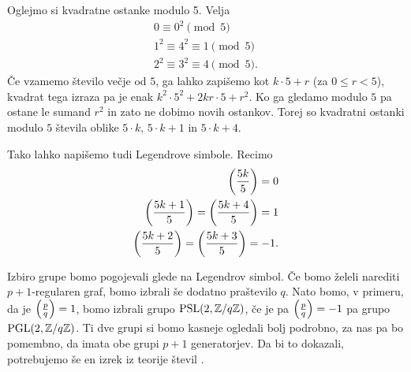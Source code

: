\begin{primer}
    Oglejmo si kvadratne ostanke modulo 5.
    Velja
    \begin{align*}
        0 \equiv 0^2 \pmod 5            \\
        1^2 \equiv 4^2 \equiv 1 \pmod 5 \\
        2^2 \equiv 3^2 \equiv 4 \pmod 5.
    \end{align*}
    Če vzamemo število večje od \(5\), ga lahko zapišemo kot \(k\cdot 5 + r\) (za \(0\leq r <5\)), kvadrat tega izraza pa je enak \(k^2\cdot 5^2 + 2kr\cdot 5 + r^2\). Ko ga gledamo modulo \(5\) pa ostane le sumand \(r^2\) in zato ne dobimo novih ostankov. Torej so kvadratni ostanki modulo \(5\) števila oblike \(5\cdot k\), \(5\cdot k + 1\) in \(5\cdot k + 4\).

    Tako lahko napišemo tudi Legendrove simbole. Recimo
    \begin{align*}
        \left(\frac{5k}{5}\right) = 0                            \\
        \left(\frac{5k + 1}{5}\right) = \left(\frac{5k + 4}{5}\right) = 1 \\
        \left(\frac{5k + 2}{5}\right) = \left(\frac{5k + 3}{5}\right) = -1.
    \end{align*}
\end{primer}

Izbiro grupe bomo pogojevali glede na Legendrov simbol. Če bomo želeli narediti \(p+1\)-regularen graf, bomo izbrali še dodatno praštevilo \(q\). Nato bomo, v primeru, da je \(\left(\frac{p}{q}\right)=1\), bomo izbrali grupo \(\operatorname{PSL}(2, \mathbb Z/q\mathbb Z)\), če je pa \(\left(\frac{p}{q}\right)=-1\) pa grupo \(\operatorname{PGL}(2, \mathbb Z/q\mathbb Z)\). Ti dve grupi si bomo kasneje ogledali bolj podrobno, za nas pa bo pomembno, da imata obe grupi \(p+1\) generatorjev. Da bi to dokazali, potrebujemo še en izrek iz teorije števil \cite{Hirschhorn_1982}.

